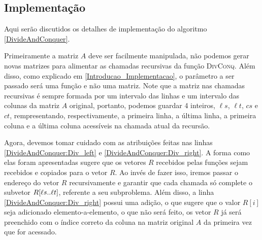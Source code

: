 \subsection{Implementação} \label{DivisaoEConquista_Implementacao}
Aqui serão discutidos os detalhes de implementação do algoritmo \ref{DivideAndConquer}.  

Primeiramente a matriz $A$ deve ser facilmente manipulada, não podemos gerar novas matrizes para alimentar as chamadas recursivas da função \hbox{\textsc{DivConq}}. Além disso, como explicado em \ref{Introducao_Implementacao}, o parâmetro a ser passado será uma função e não uma matriz. Note que a matriz nas chamadas recursivas é sempre formada por um intervalo das linhas e um intervalo das colunas da matriz $A$ original, portanto, podemos guardar 4 inteiros, $\ell s$, $\ell t$, $cs$ e $ct$, rempresentando, respectivamente, a primeira linha, a última linha, a primeira coluna e a última coluna acessíveis na chamada atual da recursão.  

Agora, devemos tomar cuidado com as atribuições feitas nas linhas \ref{DivideAndConquer:Div_left} e \ref{DivideAndConquer:Div_right}. A forma como elas foram apresentadas sugere que os vetores $R$ recebidos pelas funções sejam recebidos e copiados para o vetor $R$. Ao invés de fazer isso, iremos passar o endereço do vetor $R$ recursivamente e garantir que cada chamada só complete o subvetor $R[\ell s .. \ell t]$, referente a seu subproblema. Além disso, a linha \ref{DivideAndConquer:Div_right} possui uma adição, o que sugere que o valor $R[i]$ seja adicionado elemento-a-elemento, o que não será feito, os vetor $R$ já será preenchido com o índice correto da coluna na matriz original $A$ da primeira vez que for acessado.
